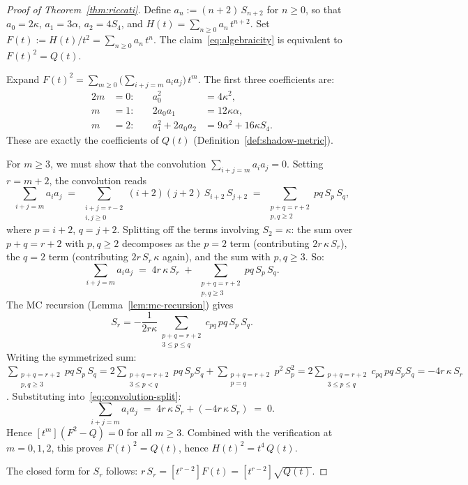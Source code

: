\documentclass[11pt]{article}
\theoremstyle{plain}
\theoremstyle{definition}
\theoremstyle{remark}
\begin{document}
\begin{proof}[Proof of Theorem~\textup{\ref{thm:riccati}}]
Define $a_n := (n+2)\,S_{n+2}$ for $n \geq 0$, so that
$a_0 = 2\kappa$, $a_1 = 3\alpha$, $a_2 = 4S_4$, and
$H(t) = \sum_{n \geq 0} a_n\,t^{n+2}$.
Set $F(t) := H(t)/t^2 = \sum_{n \geq 0} a_n\,t^n$.
The claim~\eqref{eq:algebraicity} is equivalent to
$F(t)^2 = Q(t)$.

Expand $F(t)^2 = \sum_{m \geq 0}
\bigl(\sum_{i+j=m} a_i a_j\bigr)\,t^m$.
The first three coefficients are:
\begin{alignat*}{2}
 m &= 0: &\quad a_0^2 &= 4\kappa^2, \\
 m &= 1: &\quad 2a_0 a_1 &= 12\kappa\alpha, \\
 m &= 2: &\quad a_1^2 + 2a_0 a_2 &= 9\alpha^2 + 16\kappa S_4.
\end{alignat*}
These are exactly the coefficients of $Q(t)$
(Definition~\ref{def:shadow-metric}).

For $m \geq 3$, we must show that the convolution
$\sum_{i+j=m} a_i a_j = 0$.
Setting $r = m + 2$, the convolution reads
\[
 \sum_{i+j=m} a_i a_j
 \;=\;
 \sum_{\substack{i+j = r-2 \\ i, j \geq 0}}
 (i+2)(j+2)\,S_{i+2}\,S_{j+2}
 \;=\;
 \sum_{\substack{p+q = r+2 \\ p, q \geq 2}}
 pq\,S_p\,S_q,
\]
where $p = i+2$, $q = j+2$.
Splitting off the terms involving $S_2 = \kappa$:
the sum over $p + q = r + 2$ with $p, q \geq 2$ decomposes
as the $p = 2$ term (contributing $2r\,\kappa\,S_r$),
the $q = 2$ term (contributing $2r\,S_r\,\kappa$ again),
and the sum with $p, q \geq 3$. So:
\begin{equation}\label{eq:convolution-split}
 \sum_{i+j=m} a_i a_j
 \;=\;
 4r\,\kappa\,S_r
 \;+\;
 \sum_{\substack{p+q=r+2 \\ p,q \geq 3}} pq\,S_p\,S_q.
\end{equation}
The MC recursion (Lemma~\ref{lem:mc-recursion}) gives
\[
 S_r = -\frac{1}{2r\kappa}
 \sum_{\substack{p+q=r+2 \\ 3 \leq p \leq q}}
 c_{pq}\,pq\,S_p\,S_q.
\]
Writing the symmetrized sum:
$\sum_{\substack{p+q=r+2 \\ p,q \geq 3}} pq\,S_p\,S_q
= 2 \sum_{\substack{p+q=r+2 \\ 3 \leq p < q}} pq\,S_p S_q
+ \sum_{\substack{p+q=r+2 \\ p=q}} p^2\,S_p^2
= 2 \sum_{\substack{p+q=r+2 \\ 3 \leq p \leq q}}
c_{pq}\,pq\,S_p S_q
= -4r\,\kappa\,S_r$.
Substituting into~\eqref{eq:convolution-split}:
\[
 \sum_{i+j=m} a_i a_j
 \;=\;
 4r\,\kappa\,S_r + (-4r\,\kappa\,S_r)
 \;=\; 0.
\]
Hence $[t^m](F^2 - Q) = 0$ for all $m \geq 3$.
Combined with the verification at $m = 0, 1, 2$,
this proves $F(t)^2 = Q(t)$, hence $H(t)^2 = t^4\,Q(t)$.

The closed form for $S_r$ follows:
$r\,S_r = [t^{r-2}]F(t) = [t^{r-2}]\sqrt{Q(t)}$.
\end{proof}
\end{document}
